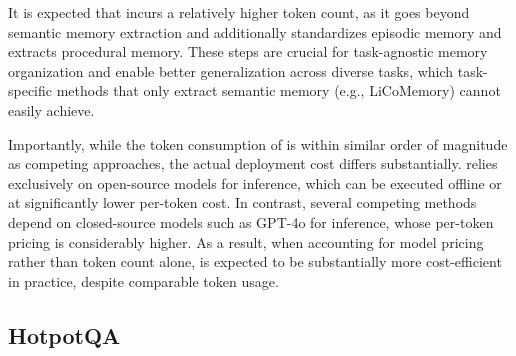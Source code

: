It is expected that \plugmem incurs a relatively higher token count, as it goes beyond semantic memory extraction and additionally standardizes episodic memory and extracts procedural memory. These steps are crucial for task-agnostic memory organization and enable better generalization across diverse tasks, which task-specific methods that only extract semantic memory (e.g., LiCoMemory) cannot easily achieve.

Importantly, while the token consumption of \plugmem is within similar order of magnitude as competing approaches, the actual deployment cost differs substantially. \plugmem relies exclusively on open-source models for inference, which can be executed offline or at significantly lower per-token cost. In contrast, several competing methods depend on closed-source models such as GPT-4o for inference, whose per-token pricing is considerably higher. As a result, when accounting for model pricing rather than token count alone, \plugmem is expected to be substantially more cost-efficient in practice, despite comparable token usage.

\begin{table}[]
\centering
\caption{Token Cost Statistics on LongMemEval. (\~k tokens per sample)}
\label{tab:apdx_longmemeval_token_cost_stats}
\end{table}


\subsection{HotpotQA}

